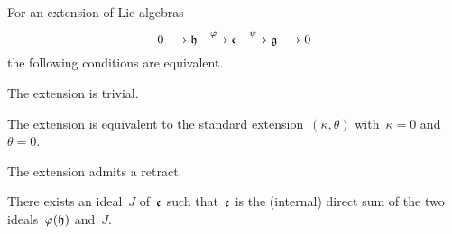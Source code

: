 \begin{proposition}
	For an extension of Lie algebras
	\[
		0
		\to
		\hlie
		\xto{\varphi}
		\elie
		\xto{\psi}
		\glie
		\to
		0
	\]
	the following conditions are equivalent.
	\begin{equivalenceslist*}
		\item
			\label{extension is trivial}
			The extension is trivial.
		\item
			\label{extension is equivalent to 0 0}
			The extension is equivalent to the standard extension~$(\kappa, \theta)$ with~$\kappa = 0$ and~$\theta = 0$.
		\item
			\label{extension admits a retract}
			The extension admits a retract.
		\item
			\label{image of h admits a direct complement}
			There exists an ideal~$J$ of~$\mathfrak{e}$ such that~$\mathfrak{e}$ is the (internal) direct sum of the two ideals~$\varphi(\mathfrak{h})$ and~$J$.
	\end{equivalenceslist*}
\end{proposition}

